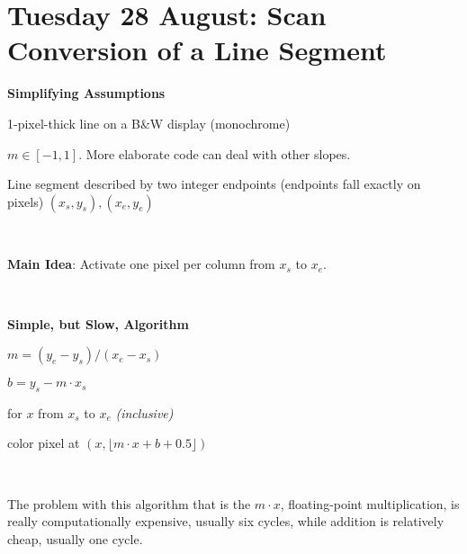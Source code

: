 \section{Tuesday 28 August:  Scan Conversion of a Line Segment}

{\bf Simplifying Assumptions}

1-pixel-thick line on a B\&W display (monochrome)

$m \in [-1,1]$.  More elaborate code can deal with other slopes.

Line segment described by two integer endpoints (endpoints fall exactly on pixels) $(x_s,y_s), (x_e,y_e)$

\

\hfil{}

{\bf Main Idea}:  Activate one pixel per column from $x_s$ to $x_e$.  

\

\hfil{}

{\bf Simple, but Slow, Algorithm}

$m = (y_e - y_s) / (x_e - x_s)$

$b = y_s - m \cdot x_s$

for $x$ from $x_s$ to $x_e$ {\color{red} \it (inclusive)}

\qquad color pixel at $(x, \lfloor m \cdot x + b + 0.5 \rfloor)$

\

The problem with this algorithm that is the $m \cdot x$, floating-point multiplication, is really computationally expensive, usually six cycles, while addition is relatively cheap, usually one cycle.  

